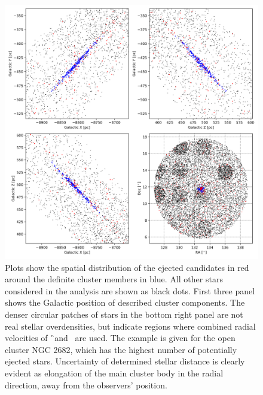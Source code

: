 \begin{figure}
	\centering
	\includegraphics[width=\textwidth]{NGC_2682_possible_ejected-step1.png}
	\caption{Plots show the spatial distribution of the ejected candidates in red around the definite cluster members in blue. All other stars considered in the analysis are shown as black dots. First three panel shows the Galactic position of described cluster components. The denser circular patches of stars in the bottom right panel are not real stellar overdensities, but indicate regions where combined radial velocities of \G\ and \Gh\ are used. The example is given for the open cluster NGC 2682, which has the highest number of potentially ejected stars. Uncertainty of determined stellar distance is clearly evident as elongation of the main cluster body in the radial direction, away from the observers' position.}
	\label{fig:ejected_around_cluster}
\end{figure}

